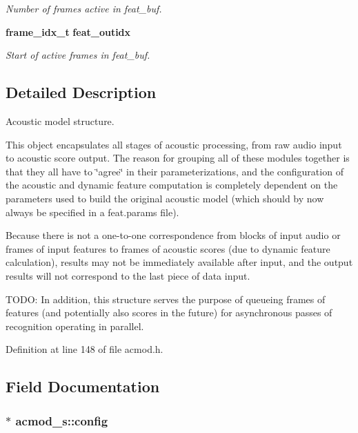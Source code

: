 \begin{DoxyCompactItemize}
\begin{DoxyCompactList}\small\item\em Number of frames active in feat\-\_\-buf. \end{DoxyCompactList}\item 
{\bf frame\-\_\-idx\-\_\-t} {\bf feat\-\_\-outidx}\label{structacmod__s_ae15076737bcdcbe1d5b4226f7a0b3f5b}

\begin{DoxyCompactList}\small\item\em Start of active frames in feat\-\_\-buf. \end{DoxyCompactList}\end{DoxyCompactItemize}


\subsection{Detailed Description}
Acoustic model structure. 

This object encapsulates all stages of acoustic processing, from raw audio input to acoustic score output. The reason for grouping all of these modules together is that they all have to \char`\"{}agree\char`\"{} in their parameterizations, and the configuration of the acoustic and dynamic feature computation is completely dependent on the parameters used to build the original acoustic model (which should by now always be specified in a feat.\-params file).

Because there is not a one-\/to-\/one correspondence from blocks of input audio or frames of input features to frames of acoustic scores (due to dynamic feature calculation), results may not be immediately available after input, and the output results will not correspond to the last piece of data input.

T\-O\-D\-O\-: In addition, this structure serves the purpose of queueing frames of features (and potentially also scores in the future) for asynchronous passes of recognition operating in parallel. 

Definition at line 148 of file acmod.\-h.



\subsection{Field Documentation}
\subsubsection[{config}]{$\ast$ acmod\-\_\-s\-::config}\label{structacmod__s_a3563f4d0bdc48d3ee140b9e28806279d}


